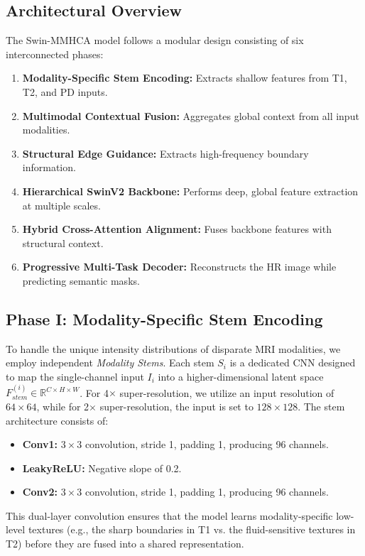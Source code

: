 \documentclass{IEEEoj}
\begin{document}
\subsection{Architectural Overview}
The Swin-MMHCA model follows a modular design consisting of six interconnected phases:
\begin{enumerate}
    \item \textbf{Modality-Specific Stem Encoding:} Extracts shallow features from T1, T2, and PD inputs.
    \item \textbf{Multimodal Contextual Fusion:} Aggregates global context from all input modalities.
    \item \textbf{Structural Edge Guidance:} Extracts high-frequency boundary information.
    \item \textbf{Hierarchical SwinV2 Backbone:} Performs deep, global feature extraction at multiple scales.
    \item \textbf{Hybrid Cross-Attention Alignment:} Fuses backbone features with structural context.
    \item \textbf{Progressive Multi-Task Decoder:} Reconstructs the HR image while predicting semantic masks.
\end{enumerate}

\subsection{Phase I: Modality-Specific Stem Encoding}
To handle the unique intensity distributions of disparate MRI modalities, we employ independent \textit{Modality Stems}. Each stem $S_i$ is a dedicated CNN designed to map the single-channel input $I_i$ into a higher-dimensional latent space $F_{stem}^{(i)} \in \mathbb{R}^{C \times H \times W}$. For 4$\times$ super-resolution, we utilize an input resolution of $64 \times 64$, while for 2$\times$ super-resolution, the input is set to $128 \times 128$.
The stem architecture consists of:
\begin{itemize}
    \item \textbf{Conv1:} $3 \times 3$ convolution, stride 1, padding 1, producing 96 channels.
    \item \textbf{LeakyReLU:} Negative slope of 0.2.
    \item \textbf{Conv2:} $3 \times 3$ convolution, stride 1, padding 1, producing 96 channels.
\end{itemize}
This dual-layer convolution ensures that the model learns modality-specific low-level textures (e.g., the sharp boundaries in T1 vs. the fluid-sensitive textures in T2) before they are fused into a shared representation.
\end{document}
